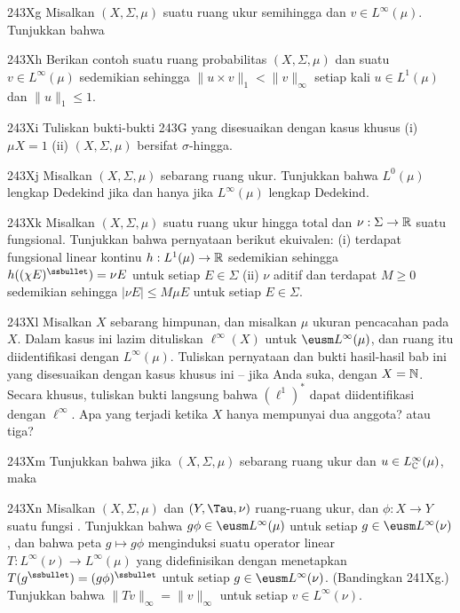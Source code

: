 {\spheader 243Xg Misalkan $(X,\Sigma,\mu)$ suatu ruang ukur semihingga dan
$v\in L^{\infty}(\mu)$. Tunjukkan bahwa
     

\spheader 243Xh Berikan contoh suatu ruang probabilitas
$(X,\Sigma,\mu)$ dan suatu $v\in L^{\infty}(\mu)$ sedemikian sehingga
$\|u\times v\|_1<\|v\|_{\infty}$ setiap kali $u\in L^1(\mu)$ dan
$\|u\|_1\le 1$.
     
\spheader 243Xi Tuliskan bukti-bukti 243G yang disesuaikan dengan kasus
khusus (i) $\mu X=1$ (ii) $(X,\Sigma,\mu)$ bersifat $\sigma$-hingga.
     
\spheader 243Xj Misalkan $(X,\Sigma,\mu)$ sebarang ruang ukur.
Tunjukkan bahwa $L^0(\mu)$ lengkap Dedekind jika dan hanya jika
$L^{\infty}(\mu)$ lengkap Dedekind.
     
\spheader 243Xk Misalkan $(X,\Sigma,\mu)$ suatu ruang ukur hingga total
dan $\nu:\Sigma\to\Bbb R$ suatu fungsional. Tunjukkan bahwa pernyataan
berikut ekuivalen: (i) terdapat fungsional linear kontinu
$h:L^1(\mu)\to\Bbb R$ sedemikian sehingga
$h((\chi E)^{\ssbullet})=\nu E$ untuk setiap $E\in\Sigma$ (ii) $\nu$
aditif dan terdapat $M\ge 0$ sedemikian sehingga
$|\nu E|\le M\mu E$ untuk setiap $E\in\Sigma$.
     
\sqheader 243Xl Misalkan $X$ sebarang himpunan, dan misalkan $\mu$ ukuran
pencacahan pada $X$. Dalam kasus ini lazim dituliskan $\ell^{\infty}(X)$
untuk $\eusm L^{\infty}(\mu)$, dan ruang itu diidentifikasi dengan
$L^{\infty}(\mu)$. Tuliskan pernyataan dan bukti hasil-hasil bab ini yang
disesuaikan dengan kasus khusus ini -- jika Anda suka, dengan $X=\Bbb N$.
Secara khusus, tuliskan bukti langsung bahwa $(\ell^1)^*$ dapat
diidentifikasi dengan $\ell^{\infty}$. Apa yang terjadi ketika $X$
hanya mempunyai dua anggota? atau tiga?
     
\spheader 243Xm Tunjukkan bahwa jika $(X,\Sigma,\mu)$ sebarang ruang ukur
dan $u\in L^{\infty}_{\Bbb C}(\mu)$, maka
     
     
\spheader 243Xn Misalkan $(X,\Sigma,\mu)$ dan $(Y,\Tau,\nu)$ ruang-ruang
ukur, dan $\phi:X\to Y$ suatu fungsi \imp. Tunjukkan bahwa
$g\phi\in\eusm L^{\infty}(\mu)$ untuk setiap
$g\in\eusm L^{\infty}(\nu)$, dan bahwa peta $g\mapsto g\phi$ menginduksi
suatu operator linear $T:L^{\infty}(\nu)\to L^{\infty}(\mu)$ yang
didefinisikan dengan menetapkan
$T(g^{\ssbullet})=(g\phi)^{\ssbullet}$ untuk setiap
$g\in\eusm L^{\infty}(\nu)$. (Bandingkan 241Xg.) Tunjukkan bahwa
$\|Tv\|_{\infty}=\|v\|_{\infty}$ untuk setiap
$v\in L^{\infty}(\nu)$.
     
}

